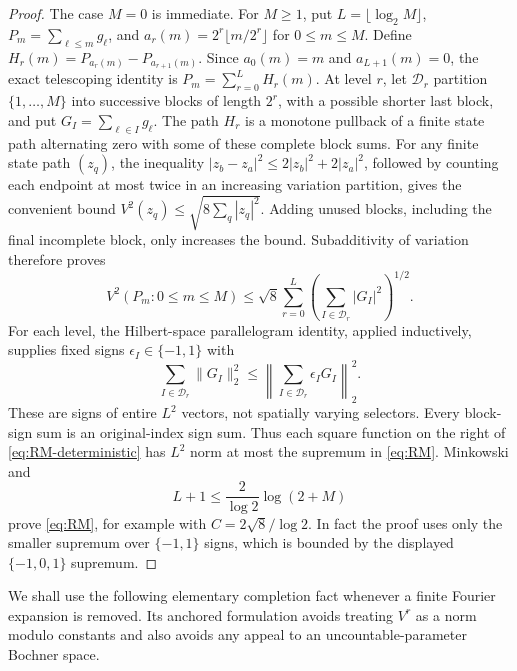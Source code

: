 \documentclass[11pt]{article}
\numberwithin{equation}{section}
\theoremstyle{remark}
\theoremstyle{definition}
\begin{document}
\begin{proof}
The case $M=0$ is immediate.  For $M\ge1$, put
$L=\lfloor\log_2 M\rfloor$, $P_m=\sum_{\ell\le m}g_\ell$, and
$a_r(m)=2^r\lfloor m/2^r\rfloor$ for $0\le m\le M$.
Define $H_r(m)=P_{a_r(m)}-P_{a_{r+1}(m)}$.
Since $a_0(m)=m$ and $a_{L+1}(m)=0$, the exact telescoping identity is
$P_m=\sum_{r=0}^L H_r(m)$.
At level $r$, let $\mathcal D_r$ partition $\{1,\ldots,M\}$ into
successive blocks of length $2^r$, with a possible shorter last block,
and put $G_I=\sum_{\ell\in I}g_\ell$.
The path $H_r$ is a monotone pullback of a finite state path alternating
zero with some of these complete block sums.  For any finite state path
$(z_q)$, the inequality
$|z_b-z_a|^2\le2|z_b|^2+2|z_a|^2$, followed by counting each endpoint
at most twice in an increasing variation partition, gives the convenient
bound $V^2(z_q)\le\sqrt{8\sum_q|z_q|^2}$.
Adding unused blocks, including the final incomplete block, only increases
the bound.  Subadditivity of variation therefore proves
\begin{equation}\label{eq:RM-deterministic}
 V^2(P_m:0\le m\le M)
 \le\sqrt8\sum_{r=0}^L
 \left(\sum_{I\in\mathcal D_r}|G_I|^2\right)^{1/2}.
\end{equation}
For each level, the Hilbert-space parallelogram identity, applied
inductively, supplies fixed signs $\epsilon_I\in\{-1,1\}$ with
\[
 \sum_{I\in\mathcal D_r}\|G_I\|_2^2
 \le\left\|\sum_{I\in\mathcal D_r}\epsilon_I G_I\right\|_2^2.
\]
These are signs of entire $L^2$ vectors, not spatially varying selectors.
Every block-sign sum is an original-index sign sum.  Thus each square
function on the right of \eqref{eq:RM-deterministic} has $L^2$ norm at
most the supremum in \eqref{eq:RM}.  Minkowski and
\[
 L+1\le\frac{2}{\log2}\log(2+M)
\]
prove \eqref{eq:RM}, for example with $C=2\sqrt8/\log2$.
In fact the proof uses only the smaller supremum over
$\{-1,1\}$ signs, which is bounded by the displayed
$\{-1,0,1\}$ supremum.
\end{proof}

We shall use the following elementary completion fact whenever a finite
Fourier expansion is removed.  Its anchored formulation avoids treating
$V^r$ as a norm modulo constants and also avoids any appeal to an
uncountable-parameter Bochner space.
\end{document}
